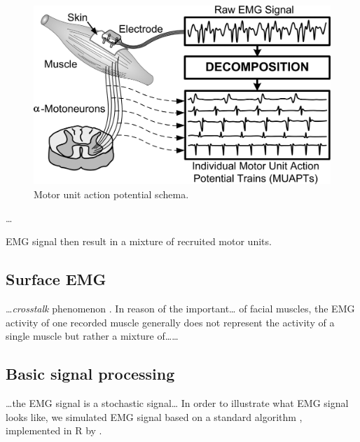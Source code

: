 \documentclass[12pt,]{book}
\newenvironment{Shaded}{\begin{snugshade}}{\end{snugshade}}
\newcommand{\KeywordTok}[1]{\textcolor[rgb]{0.13,0.29,0.53}{\textbf{#1}}}
\newcommand{\DataTypeTok}[1]{\textcolor[rgb]{0.13,0.29,0.53}{#1}}
\newcommand{\DecValTok}[1]{\textcolor[rgb]{0.00,0.00,0.81}{#1}}
\newcommand{\StringTok}[1]{\textcolor[rgb]{0.31,0.60,0.02}{#1}}
\newcommand{\OperatorTok}[1]{\textcolor[rgb]{0.81,0.36,0.00}{\textbf{#1}}}
\newcommand{\NormalTok}[1]{#1}
\begin{document}
\begin{figure}

{\centering \includegraphics{assets/muap} 

}

\caption{Motor unit action potential schema.}\label{fig:unnamed-chunk-1}
\end{figure}

\ldots{}

EMG signal then result in a mixture of recruited motor units.

\subsection{Surface EMG}\label{surface-emg}

\ldots{}\emph{crosstalk} phenomenon \citep{DeLuca1997}. In reason of the
important\ldots{} of facial muscles, the EMG activity of one recorded
muscle generally does not represent the activity of a single muscle but
rather a mixture of\ldots{}\citet{Rapin2011}\ldots{}

\subsection{Basic signal processing}\label{basic-signal-processing}

\ldots{}the EMG signal is a stochastic signal\ldots{} In order to
illustrate what EMG signal looks like, we simulated EMG signal based on
a standard algorithm \citep[pp.70-71]{Hermens1999}, implemented in R by
\citet{Borg2014}.

\begin{Shaded}
\end{Shaded}
\end{document}
